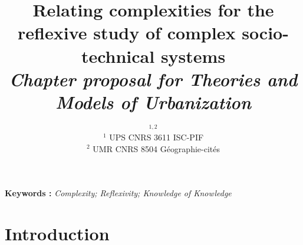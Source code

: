 


\title{%
Relating complexities for the reflexive study of complex socio-technical systems
\\\medskip
\textit{Chapter proposal for Theories and Models of Urbanization}
}
\author{$^{1,2}$\\
$^1$ UPS CNRS 3611 ISC-PIF\\
$^2$ UMR CNRS 8504 G{\'e}ographie-cit{\'e}s
}
\date{}

\maketitle

\justify



\begin{abstract}

\end{abstract}

\textbf{Keywords : }\textit{Complexity; Reflexivity; Knowledge of Knowledge}




\section{Introduction}









